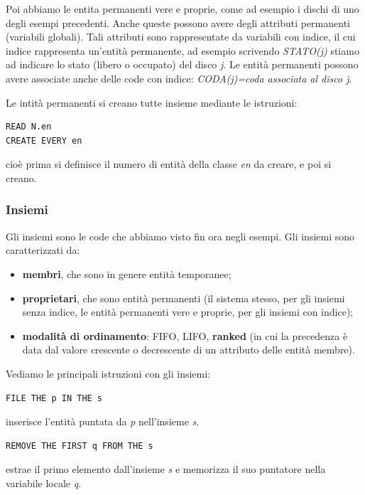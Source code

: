 \documentclass[11pt]{book}
\begin{document}
Poi abbiamo le entita permanenti vere e proprie, come ad esempio i
dischi di uno degli esempi precedenti. Anche queste possono avere
degli attributi permanenti (variabili globali). Tali attributi sono
rappresentate da variabili con indice, il cui indice rappresenta
un'entit\`a permanente, ad esempio scrivendo {\em STATO(j)} stiamo ad
indicare lo stato (libero o occupato) del disco {\em j}. Le entit\`a
permanenti possono avere associate anche delle code con indice: {\em
  CODA(j)=coda associata al disco j}.

Le intit\`a permanenti si creano tutte insieme mediante le istruzioni:

\begin{verbatim}
READ N.en
CREATE EVERY en
\end{verbatim}

cio\`e prima si definisce il numero di entit\`a della classe {\em en} da
creare, e poi si creano.

\subsubsection{Insiemi}
Gli insiemi sono le code che abbiamo visto fin ora negli esempi. Gli
insiemi sono caratterizzati da:
\begin{itemize}
\item {\bf membri}, che sono in genere entit\`a temporanee; 
\item {\bf proprietari}, che sono entit\`a permanenti (il sistema
  stesso, per gli insiemi senza indice, le entit\`a permanenti vere e
  proprie, per gli insiemi con indice);
\item {\bf modalit\`a di ordinamento}: FIFO, LIFO, {\bf ranked} (in cui
  la precedenza \`e data dal valore crescente o decrescente di un
  attributo delle entit\`a membre).
\end{itemize}

Vediamo le principali istruzioni con gli insiemi:

\begin{verbatim}
FILE THE p IN THE s
\end{verbatim}

inserisce l'entit\`a puntata da {\em p} nell'insieme {\em s}.

\begin{verbatim}
REMOVE THE FIRST q FROM THE s
\end{verbatim}

estrae il primo elemento dall'insieme {\em s} e memorizza il suo
puntatore nella variabile locale {\em q}.  
\end{document}
